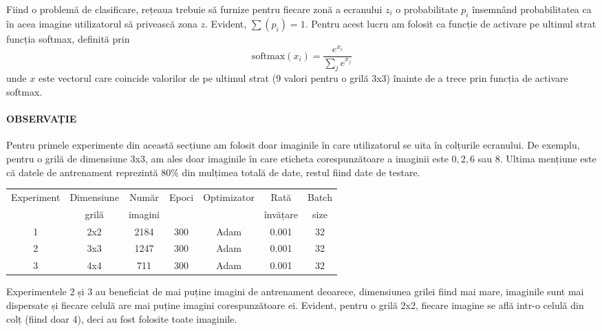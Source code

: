 Fiind o problemă de clasificare, rețeaua trebuie să furnize pentru fiecare zonă a ecranului $z_i$ o probabilitate $p_i$ însemnând probabilitatea ca în acea imagine utilizatorul să privească zona $z$.
Evident, $\sum(p_i) = 1$.
Pentru acest lucru am folosit ca funcție de activare pe ultimul strat funcția softmax, definită prin
$$
\text{softmax}(x_i) = \frac{e^{x_i}}{\sum_j{e^{x_j}}}
$$
unde $x$ este vectorul care coincide valorilor de pe ultimul strat (9 valori pentru o grilă 3x3) înainte de a trece prin funcția de activare softmax.


\paragraph{OBSERVAȚIE}
Pentru primele experimente din această secțiune am folosit doar imaginile în care utilizatorul se uita în colțurile ecranului.
De exemplu, pentru o grilă de dimensiune 3x3, am ales doar imaginile în care eticheta corespunzătoare a imaginii este $0, 2, 6$ sau $8$.
Ultima mențiune este că datele de antrenament reprezintă $80\%$ din mulțimea totală de date, restul fiind date de testare.

\begin{center}
    \begin{tabular}{ c | c | c | c | c | c | c }
        \hline
        Experiment & Dimensiune & Număr   & Epoci & Optimizator & Rată     & Batch \\ 
                   & grilă      & imagini &       &             & învățare & size  \\ 
        \hline
        1 & 2x2 & 2184 & 300 & Adam & 0.001 & 32 \\
        \hline
        2 & 3x3 & 1247 & 300 & Adam & 0.001 & 32 \\
        \hline
        3 & 4x4 & 711 & 300 & Adam & 0.001 & 32 \\
        \hline
    \end{tabular}
\end{center}

Experimentele 2 și 3 au beneficiat de mai puține imagini de antrenament deoarece, dimensiunea grilei fiind mai mare, imaginile sunt mai dispersate și fiecare celulă are mai puține imagini corespunzătoare ei.
Evident, pentru o grilă 2x2, fiecare imagine se află intr-o celulă din colț (fiind doar 4), deci au fost folosite toate imaginile.

